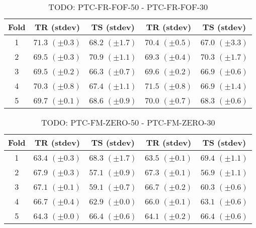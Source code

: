 \documentclass[10pt,a4paper]{book}
\begin{document}


\begin{table}[tbph]
\caption{TODO: PTC-FR-FOF-50 - PTC-FR-FOF-30}
\label{TODO}
\centering
\begin{tabular}{c*{4}{c}}
\toprule
Fold & TR (stdev) & TS (stdev) & TR (stdev) & TS (stdev)\\
\midrule
1 & $71.3$ $(\pm 0.3)$ & $68.2$ $(\pm 1.7)$ & $70.4$ $(\pm 0.5)$ & $67.0$ $(\pm 3.3)$\\
2 & $69.5$ $(\pm 0.3)$ & $70.9$ $(\pm 1.1)$ & $69.3$ $(\pm 0.4)$ & $70.3$ $(\pm 1.7)$\\
3 & $69.5$ $(\pm 0.2)$ & $66.3$ $(\pm 0.7)$ & $69.6$ $(\pm 0.2)$ & $66.9$ $(\pm 0.6)$\\
4 & $70.3$ $(\pm 0.8)$ & $67.4$ $(\pm 1.1)$ & $71.5$ $(\pm 0.8)$ & $66.9$ $(\pm 1.4)$\\
5 & $69.7$ $(\pm 0.1)$ & $68.6$ $(\pm 0.9)$ & $70.0$ $(\pm 0.7)$ & $68.3$ $(\pm 0.6)$\\
\bottomrule
\end{tabular}
\end{table}



\begin{table}[tbph]
\caption{TODO: PTC-FM-ZERO-50 - PTC-FM-ZERO-30}
\label{TODO}
\centering
\begin{tabular}{c*{4}{c}}
\toprule
Fold & TR (stdev) & TS (stdev) & TR (stdev) & TS (stdev)\\
\midrule
1 & $63.4$ $(\pm 0.3)$ & $68.3$ $(\pm 1.7)$ & $63.5$ $(\pm 0.1)$ & $69.4$ $(\pm 1.1)$\\
2 & $67.9$ $(\pm 0.3)$ & $57.1$ $(\pm 0.9)$ & $67.3$ $(\pm 0.1)$ & $56.9$ $(\pm 1.1)$\\
3 & $67.1$ $(\pm 0.1)$ & $59.1$ $(\pm 0.7)$ & $66.7$ $(\pm 0.2)$ & $60.3$ $(\pm 0.6)$\\
4 & $66.7$ $(\pm 0.4)$ & $62.9$ $(\pm 0.0)$ & $66.0$ $(\pm 0.1)$ & $63.1$ $(\pm 0.6)$\\
5 & $64.3$ $(\pm 0.0)$ & $66.4$ $(\pm 0.6)$ & $64.1$ $(\pm 0.2)$ & $66.4$ $(\pm 0.6)$\\
\bottomrule
\end{tabular}
\end{table}


\end{document}
